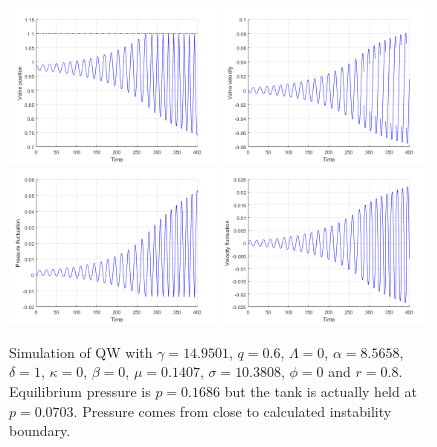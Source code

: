\begin{figure}[ht]
    \centering
    \includegraphics[width=0.49\textwidth]{Figures/QWMSimulation/SustOscilWithImpact/ValvePosition.png}
    \includegraphics[width=0.49\textwidth]{Figures/QWMSimulation/SustOscilWithImpact/Velocity.png}
    \includegraphics[width=0.49\textwidth]{Figures/QWMSimulation/SustOscilWithImpact/B.png}
    \includegraphics[width=0.49\textwidth]{Figures/QWMSimulation/SustOscilWithImpact/C.png}
    \caption{Simulation of QW with $\gamma = 14.9501$, $q = 0.6$, $\Lambda = 0$, $\alpha = 8.5658$, $\delta = 1$, $\kappa = 0$, $\beta = 0$, $\mu = 0.1407$, $\sigma = 10.3808$, $\phi = 0$ and $r = 0.8$. Equilibrium pressure is $p = 0.1686$ but the tank is actually held at $p = 0.0703$. Pressure comes from close to calculated instability boundary.}
    \label{fig: QWSustOsc}
\end{figure}